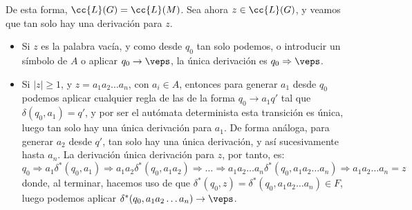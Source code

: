 \documentclass[12pt]{article}
\begin{document}
\begin{ejercicio}[1.25 puntos]
        De esta forma, $\cc{L}(G)=\cc{L}(M)$. Sea ahora $z\in \cc{L}(G)$, y veamos que tan solo hay una derivación para $z$.
        \begin{itemize}
            \item Si $z$ es la palabra vacía, y como desde $q_0$ tan solo podemos, o introducir un símbolo de $A$ o aplicar $q_0\to \veps$, la única derivación es $q_0\Rightarrow \veps$.
            \item Si $|z|\geq 1$, y $z=a_1a_2\ldots a_n$, con $a_i\in A$, entonces para generar $a_1$ desde $q_0$ podemos aplicar cualquier regla de las de la forma $q_0\to a_1q'$ tal que $\delta(q_0,a_1)=q'$, y por ser el autómata determinista esta transición es única, luego tan solo hay una única derivación para $a_1$. De forma análoga, para generar $a_2$ desde $q'$, tan solo hay una única derivación, y así sucesivamente hasta $a_n$. La derivación única derivación para $z$, por tanto, es:
            \begin{equation*}
                q_0\Rightarrow a_1\delta^*(q_0,a_1)\Rightarrow a_1a_2\delta^*(q_0,a_1a_2)\Rightarrow \ldots \Rightarrow a_1a_2\ldots a_n\delta^*(q_0,a_1a_2\ldots a_n)\Rightarrow a_1a_2\ldots a_n=z
            \end{equation*}
            donde, al terminar, hacemos uso de que $\delta^*(q_0,z)=\delta^*(q_0,a_1a_2\ldots a_n)\in F$, luego podemos aplicar $\delta^*(q_0,a_1a_2\ldots a_n)\to \veps$.
        \end{itemize}
    \end{ejercicio}
\end{document}
